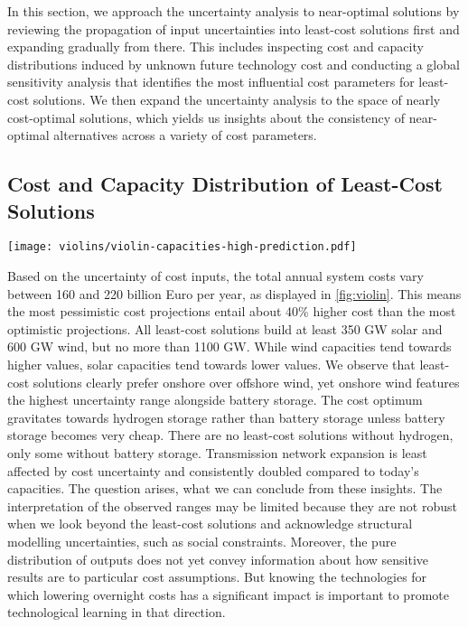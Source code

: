 In this section, we approach the uncertainty analysis to near-optimal solutions
by reviewing the propagation of input uncertainties into least-cost solutions
first and expanding gradually from there. This includes inspecting cost and
capacity distributions induced by unknown future technology cost and conducting
a global sensitivity analysis that identifies the most influential cost
parameters for least-cost solutions. We then expand the uncertainty analysis to
the space of nearly cost-optimal solutions, which yields us insights about the
consistency of near-optimal alternatives across a variety of cost parameters.

\subsection{Cost and Capacity Distribution of Least-Cost Solutions}

\begin{SCfigure}
    \texttt{[image: violins/violin-capacities-high-prediction.pdf]}
    \caption{
      Distribution of total system cost, generation, storage, and transmission capacities
      for least-cost solutions.
    }
    \label{fig:violin}
\end{SCfigure}

Based on the uncertainty of cost inputs, the total annual system costs vary
between 160 and 220 billion Euro per year, as displayed in \cref{fig:violin}.
This means the most pessimistic cost projections entail about 40\% higher cost
than the most optimistic projections. All least-cost solutions build at least
350 GW solar and 600 GW wind, but no more than 1100 GW. While wind capacities
tend towards higher values, solar capacities tend towards lower values. We
observe that least-cost solutions clearly prefer onshore over offshore wind, yet
onshore wind features the highest uncertainty range alongside battery storage.
The cost optimum gravitates towards hydrogen storage rather than battery storage
unless battery storage becomes very cheap. There are no least-cost solutions
without hydrogen, only some without battery storage. Transmission network
expansion is least affected by cost uncertainty and consistently doubled
compared to today's capacities. The question arises, what we can conclude from
these insights. The interpretation of the observed ranges may be limited because
they are not robust when we look beyond the least-cost solutions and acknowledge
structural modelling uncertainties, such as social constraints. Moreover, the
pure distribution of outputs does not yet convey information about how sensitive
results are to particular cost assumptions. But knowing the technologies for
which lowering overnight costs has a significant impact is important to promote
technological learning in that direction.

